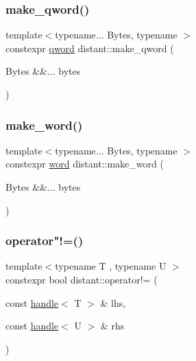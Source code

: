 \mbox{\label{namespacedistant_a88307be0e4582f81cd9644ba422bacda}} 
\subsubsection{\texorpdfstring{make\+\_\+qword()}{make\_qword()}}
{\footnotesize\ttfamily template$<$typename... Bytes, typename $>$ \\
constexpr \mbox{\hyperlink{namespacedistant_ac5f83107c559f04950d4c9fa5464364e}{qword}} distant\+::make\+\_\+qword (\begin{DoxyParamCaption}\item[{Bytes \&\&...}]{bytes }\end{DoxyParamCaption})\hspace{0.3cm}{\ttfamily [noexcept]}}

\mbox{\label{namespacedistant_a63d7f946dda0bcc5e590010a634f3285}} 
\subsubsection{\texorpdfstring{make\+\_\+word()}{make\_word()}}
{\footnotesize\ttfamily template$<$typename... Bytes, typename $>$ \\
constexpr \mbox{\hyperlink{namespacedistant_a615d26c8218c108ba83dfea768c0e130}{word}} distant\+::make\+\_\+word (\begin{DoxyParamCaption}\item[{Bytes \&\&...}]{bytes }\end{DoxyParamCaption})\hspace{0.3cm}{\ttfamily [noexcept]}}

\mbox{\label{namespacedistant_abb1f45c54df20dd0b1ad63d292155e50}} 
\subsubsection{\texorpdfstring{operator"!=()}{operator!=()}}
{\footnotesize\ttfamily template$<$typename T , typename U $>$ \\
constexpr bool distant\+::operator!= (\begin{DoxyParamCaption}\item[{const \mbox{\hyperlink{classdistant_1_1handle}{handle}}$<$ T $>$ \&}]{lhs,  }\item[{const \mbox{\hyperlink{classdistant_1_1handle}{handle}}$<$ U $>$ \&}]{rhs }\end{DoxyParamCaption})\hspace{0.3cm}{\ttfamily [noexcept]}}

